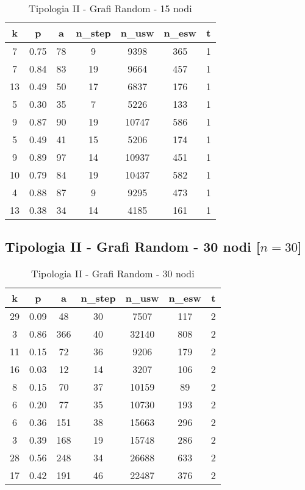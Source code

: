 \begin{table}[H]
\centering
\begin{tabular}{|c|c|c|c|c|c|c|}
\hline
\textbf{k} & \textbf{p} & \textbf{a} & \textbf{n\_step} & \textbf{n\_usw} & \textbf{n\_esw} & \textbf{t} \\ \hline
7 & 0.75 & 78 & 9 & 9398 & 365 & 1 \\ \hline
7 & 0.84 & 83 & 19 & 9664 & 457 & 1 \\ \hline
13 & 0.49 & 50 & 17 & 6837 & 176 & 1 \\ \hline
5 & 0.30 & 35 & 7 & 5226 & 133 & 1 \\ \hline
9 & 0.87 & 90 & 19 & 10747 & 586 & 1 \\ \hline
5 & 0.49 & 41 & 15 & 5206 & 174 & 1 \\ \hline
9 & 0.89 & 97 & 14 & 10937 & 451 & 1 \\ \hline
10 & 0.79 & 84 & 19 & 10437 & 582 & 1 \\ \hline
4 & 0.88 & 87 & 9 & 9295 & 473 & 1 \\ \hline
13 & 0.38 & 34 & 14 & 4185 & 161 & 1 \\ \hline
\end{tabular}
\caption{Tipologia II - Grafi Random - 15 nodi}
\label{tab:sperimentazione-tipo1-15nodi}
\end{table}

\subsection{Tipologia II - Grafi Random - 30 nodi [$n=30$]}

\begin{table}[H]
\centering
\begin{tabular}{|c|c|c|c|c|c|c|}
\hline
\textbf{k} & \textbf{p} & \textbf{a} & \textbf{n\_step} & \textbf{n\_usw} & \textbf{n\_esw} & \textbf{t} \\ \hline
29 & 0.09 & 48 & 30 & 7507 & 117 & 2 \\ \hline
3 & 0.86 & 366 & 40 & 32140 & 808 & 2 \\ \hline
11 & 0.15 & 72 & 36 & 9206 & 179 & 2 \\ \hline
16 & 0.03 & 12 & 14 & 3207 & 106 & 2 \\ \hline
8 & 0.15 & 70 & 37 & 10159 & 89 & 2 \\ \hline
6 & 0.20 & 77 & 35 & 10730 & 193 & 2 \\ \hline
6 & 0.36 & 151 & 38 & 15663 & 296 & 2 \\ \hline
3 & 0.39 & 168 & 19 & 15748 & 286 & 2 \\ \hline
28 & 0.56 & 248 & 34 & 26688 & 633 & 2 \\ \hline
17 & 0.42 & 191 & 46 & 22487 & 376 & 2 \\ \hline
\end{tabular}
\caption{Tipologia II - Grafi Random - 30 nodi}
\label{tab:sperimentazione-tipo1-30nodi}
\end{table}

